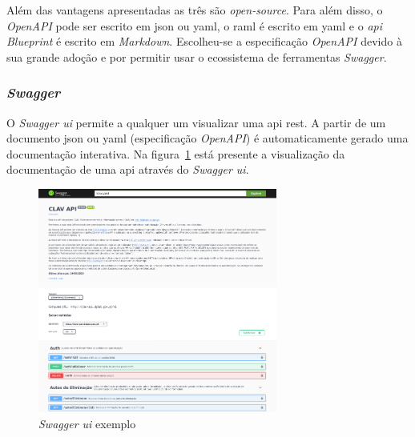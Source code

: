 Além das vantagens apresentadas as três são \textit{open-source}. Para além disso, o \textit{OpenAPI} pode ser 
escrito em \acrshort{json} ou \acrshort{yaml}, o \acrshort{raml} é escrito em \acrshort{yaml} e o 
\textit{\acrshort{api} Blueprint} é escrito em \textit{Markdown}. Escolheu-se a especificação \textit{OpenAPI} 
devido à sua grande adoção e por permitir usar o ecossistema de ferramentas \textit{Swagger}.

\subsubsection{\textit{Swagger }}

O \textit{Swagger \acrshort{ui}} permite a qualquer um visualizar uma \acrshort{api} \acrshort{rest}. 
A partir de um documento \acrshort{json} ou \acrshort{yaml} (especificação \textit{OpenAPI}) é automaticamente 
gerado uma documentação interativa. Na figura~\ref{fig:swaggerUI} está presente a visualização da
documentação de uma \acrshort{api} através do \textit{Swagger \acrshort{ui}}.

\begin{figure}[H]
    \centering
    \includegraphics[width=0.7\textwidth]{img/swaggerUI.png}
    \caption{\textit{Swagger \acrshort{ui}} exemplo\label{fig:swaggerUI}}
\end{figure}

